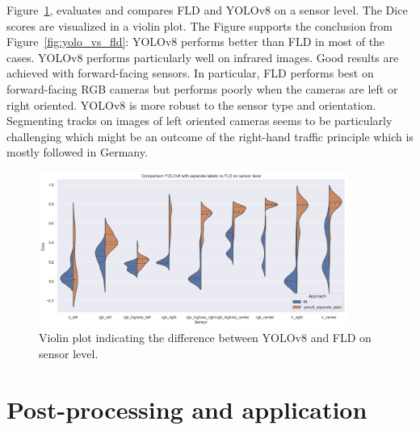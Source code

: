 \documentclass[Master,MDS,english]{BASE/twbook} %
\begin{document}
Figure~\ref{fig:yolo_models}, evaluates and compares FLD and YOLOv8 on a sensor level. 
The Dice scores are visualized in a violin plot.
The Figure supports the conclusion from Figure~\ref{fig:yolo_vs_fld}: YOLOv8 performs better than FLD in most of the cases. YOLOv8 performs particularly well on infrared images. Good results are achieved with forward-facing sensors. In particular, FLD performs best on forward-facing RGB cameras but performs poorly when the cameras are left or right oriented. YOLOv8 is more robust to the sensor type and orientation. Segmenting tracks on images of left oriented cameras seems to be particularly challenging which might be an outcome of the right-hand traffic principle which is mostly followed in Germany.


\begin{figure}[h]
\centering
\includegraphics[width=0.9\textwidth]{images/results/violin_plot_nl}
\caption{Violin plot indicating the difference between YOLOv8 and FLD on sensor level.  }
\label{fig:yolo_models}
\end{figure}



\section{Post-processing and application}
\end{document}
